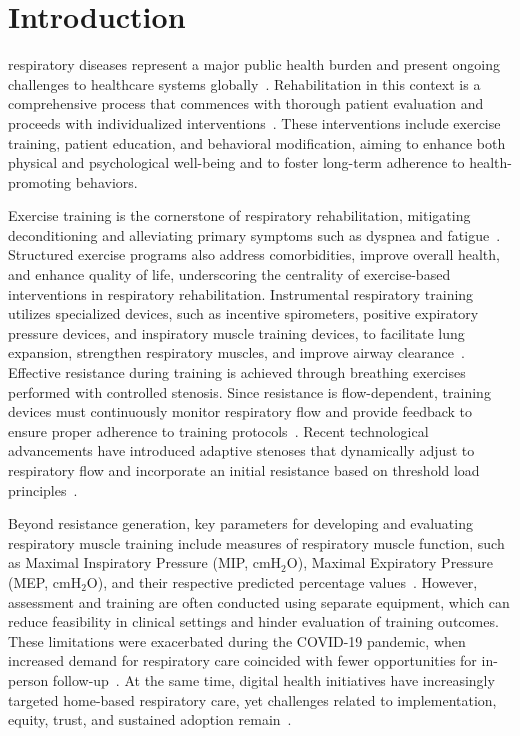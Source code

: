 \documentclass{ieeeaccess}
\begin{document}
\section{Introduction}
\label{sec:introduction}

 respiratory diseases represent a major public health burden and present ongoing challenges to healthcare systems globally~\cite{labakiChronicRespiratoryDiseases2020,merhejEpidemiologyAsthmaPrevalence2023}. Rehabilitation in this context is a comprehensive process that commences with thorough patient evaluation and proceeds with individualized interventions~\cite{Spruit2013}. These interventions include exercise training, patient education, and behavioral modification, aiming to enhance both physical and psychological well-being and to foster long-term adherence to health-promoting behaviors.

Exercise training is the cornerstone of respiratory rehabilitation, mitigating deconditioning and alleviating primary symptoms such as dyspnea and fatigue~\cite{Holland2021}. Structured exercise programs also address comorbidities, improve overall health, and enhance quality of life, underscoring the centrality of exercise-based interventions in respiratory rehabilitation. Instrumental respiratory training utilizes specialized devices, such as incentive spirometers, positive expiratory pressure devices, and inspiratory muscle training devices, to facilitate lung expansion, strengthen respiratory muscles, and improve airway clearance~\cite{Sanchez2023}. Effective resistance during training is achieved through breathing exercises performed with controlled stenosis. Since resistance is flow-dependent, training devices must continuously monitor respiratory flow and provide feedback to ensure proper adherence to training protocols~\cite{Belman1988}. Recent technological advancements have introduced adaptive stenoses that dynamically adjust to respiratory flow and incorporate an initial resistance based on threshold load principles~\cite{Gohl2016}.

Beyond resistance generation, key parameters for developing and evaluating respiratory muscle training include measures of respiratory muscle function, such as Maximal Inspiratory Pressure (MIP, \ensuremath{\mathrm{cmH_2O}}), Maximal Expiratory Pressure (MEP, \ensuremath{\mathrm{cmH_2O}}), and their respective predicted percentage values~\cite{Rietberg2017}. However, assessment and training are often conducted using separate equipment, which can reduce feasibility in clinical settings and hinder evaluation of training outcomes. These limitations were exacerbated during the COVID-19 pandemic, when increased demand for respiratory care coincided with fewer opportunities for in-person follow-up~\cite{vermaCapacityneedGapHospital2020,boroBarriersCOVID19Health2022}. At the same time, digital health initiatives have increasingly targeted home-based respiratory care, yet challenges related to implementation, equity, trust, and sustained adoption remain~\cite{pinnockImplementationDigitalHome2023,bosnic-anticevichAdvancingDigitalSolutions2023}.
\end{document}
